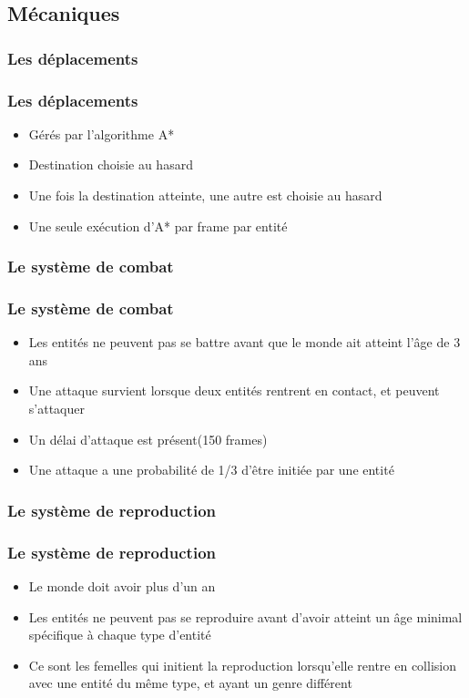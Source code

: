 \documentclass{beamer}
\begin{document}
\subsection{Mécaniques}
\subsubsection{Les déplacements}

\begin{frame} \frametitle{Les déplacements}
	\begin{itemize}
		\item Gérés par l'algorithme A*
		\item Destination choisie au hasard
		\item Une fois la destination atteinte, une autre est choisie au hasard
		\item Une seule exécution d'A* par frame par entité
	\end{itemize}
\end{frame}

\subsubsection{Le système de combat}

\begin{frame} \frametitle{Le système de combat}
	\begin{itemize}
		\item Les entités ne peuvent pas se battre avant que le monde ait atteint l'âge de 3 ans
		\item Une attaque survient lorsque deux entités rentrent en contact, et peuvent s'attaquer
		\item Un délai d'attaque est présent(150 frames)
		\item Une attaque a une probabilité de 1/3 d'être initiée par une entité
	\end{itemize}
\end{frame}

\subsubsection{Le système de reproduction}

\begin{frame} \frametitle{Le système de reproduction}
	\begin{itemize}
		\item Le monde doit avoir plus d'un an
		\item Les entités ne peuvent pas se reproduire avant d'avoir atteint un âge minimal spécifique à chaque type d'entité
		\item Ce sont les femelles qui initient la reproduction lorsqu'elle rentre en collision avec une entité du même type, et ayant un genre différent
	\end{itemize}
\end{frame}
\end{document}
